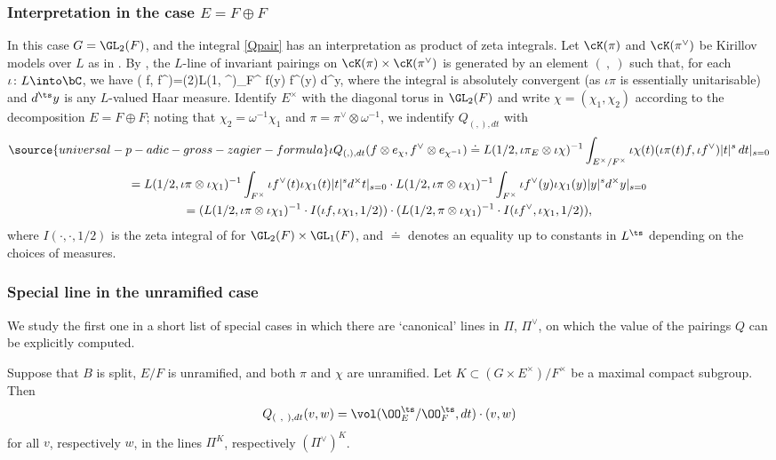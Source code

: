\subsubsection{Interpretation in the case $E=F \oplus F$} In this case   $G=\GL_{2}(F)$, and  the  integral \eqref{Qpair} has an interpretation as product of zeta integrals.  Let $\cK(\pi)$ and $\cK(\pi^{\vee})$ be Kirillov models over $L$ as in \cite[\S~ 2.3]{dd-pyzz}.
By \cite[Lemma 2.3.2]{dd-pyzz}, the $L$-line of invariant pairings on $\cK(\pi)\times\cK(\pi^{\vee})$  is generated
by an element  $(\ , \ )$ such that, for each $\iota\colon L\into \bC$,
we have
\beq \label{kir pair}
\iota ( f, f^{\vee})={\zeta(2)\over L(1, \pi\times \pi^{\vee})}\cdot \int_{F^{\times}} \iota f(y) \iota f^{\vee}(y) d^{\times }y,\eeq
where
 the integral is absolutely convergent (as $\iota\pi$ is essentially unitarisable) and $d^{\ts}y$ is any $L$-valued Haar measure. Identify $E^{\times}$ with the diagonal torus in $\GL_{2}(F)$ and write $\chi=(\chi_{1}, \chi_{2})$ according to the decomposition $E=F\oplus F$; noting that $\chi_{2}=\omega^{-1}\chi_{1}$ and $\pi=\pi^{\vee}\otimes \omega^{-1}$, we indentify   $Q_{(, ), dt}$ with
\begin{gather}\label{Qv reg}
\source{universal-p-adic-gross-zagier-formula}
\iota Q_{(, ), dt}(f\otimes e_{\chi}, f^{\vee}\otimes e_{\chi^{-1}})\doteq L(1/2, \iota \pi_{E}\otimes \iota\chi)^{-1} \int_{E^{\times}/F^{\times}} \iota \chi(t) (\iota\pi(t) f,  \iota f^{\vee} )|t|^{s}\, dt|_{s=0}\\
\nonumber
=
 L(1/2, \iota \pi\otimes \iota\chi_{1})^{-1} \int_{F^{\times}} \iota f^{\vee}(t)\iota\chi_{1}(t) |t|^{s}d^{\times }t|_{s=0}
\cdot
L(1/2, \iota \pi\otimes \iota\chi_{1})^{-1} \int_{F^{\times}} \iota f^{\vee}{}(y)\iota\chi_{1}(y) |y|^{s}d^{\times }y|_{s=0}\\
\nonumber
= (L(1/2,\iota \pi\otimes \iota \chi_{1})^{-1} \cdot I(\iota f, \iota\chi_{1}, 1/2))\cdot  (L(1/2, \pi\otimes \iota\chi_{1})^{-1} \cdot I(\iota f^{\vee} , \iota\chi_{1} , 1/2)),
\end{gather}
where $I(\cdot , \cdot , 1/2)$ is the zeta integral of \cite[\S~5.2]{LLC}
 for $\GL_{2}(F)\times \GL_{1}(F)$, and $\doteq$ denotes an equality up to constants in $L^{\ts}$ depending on the choices of measures.

\subsubsection{Special line in the unramified case} We study the first one in a short list of special cases in which there are `canonical' lines in $\Pi$, $\Pi^{\vee}$, on which  the value of the pairings $Q $ can be explicitly computed.
\begin{lemm}\label{unrQ} Suppose that $B$ is split, $E/F$ is unramified, and both $\pi$ and $\chi$ are unramified. Let $K\subset (G\times E^{\times})/F^{\times}$ be   a maximal compact subgroup. Then
$$Q_{( \ ,\  ), dt}(v, w)=\vol(\OO_{E}^{\ts}/\OO_{F}^{\ts}, dt)\cdot  (v, w)$$
 for all $v$, respectively $w$, in the lines $\Pi^{K}$, respectively $(\Pi^{\vee})^{K}$.
\end{lemm}


